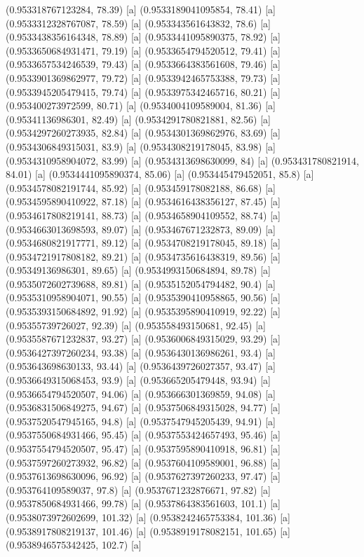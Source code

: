 {{{(0.953318767123284, 78.39) [a] 
(0.9533189041095854, 78.41) [a] 
(0.9533312328767087, 78.59) [a] 
(0.953343561643832, 78.6) [a] 
(0.9533438356164348, 78.89) [a] 
(0.9533441095890375, 78.92) [a] 
(0.9533650684931471, 79.19) [a] 
(0.9533654794520512, 79.41) [a] 
(0.9533657534246539, 79.43) [a] 
(0.9533664383561608, 79.46) [a] 
(0.9533901369862977, 79.72) [a] 
(0.9533942465753388, 79.73) [a] 
(0.9533945205479415, 79.74) [a] 
(0.9533975342465716, 80.21) [a] 
(0.953400273972599, 80.71) [a] 
(0.9534004109589004, 81.36) [a] 
(0.95341136986301, 82.49) [a] 
(0.9534291780821881, 82.56) [a] 
(0.9534297260273935, 82.84) [a] 
(0.9534301369862976, 83.69) [a] 
(0.9534306849315031, 83.9) [a] 
(0.9534308219178045, 83.98) [a] 
(0.9534310958904072, 83.99) [a] 
(0.9534313698630099, 84) [a] 
(0.953431780821914, 84.01) [a] 
(0.9534441095890374, 85.06) [a] 
(0.953445479452051, 85.8) [a] 
(0.9534578082191744, 85.92) [a] 
(0.953459178082188, 86.68) [a] 
(0.9534595890410922, 87.18) [a] 
(0.9534616438356127, 87.45) [a] 
(0.9534617808219141, 88.73) [a] 
(0.9534658904109552, 88.74) [a] 
(0.9534663013698593, 89.07) [a] 
(0.953467671232873, 89.09) [a] 
(0.9534680821917771, 89.12) [a] 
(0.9534708219178045, 89.18) [a] 
(0.9534721917808182, 89.21) [a] 
(0.9534735616438319, 89.56) [a] 
(0.95349136986301, 89.65) [a] 
(0.9534993150684894, 89.78) [a] 
(0.9535072602739688, 89.81) [a] 
(0.9535152054794482, 90.4) [a] 
(0.9535310958904071, 90.55) [a] 
(0.9535390410958865, 90.56) [a] 
(0.9535393150684892, 91.92) [a] 
(0.9535395890410919, 92.22) [a] 
(0.95355739726027, 92.39) [a] 
(0.953558493150681, 92.45) [a] 
(0.9535587671232837, 93.27) [a] 
(0.9536006849315029, 93.29) [a] 
(0.9536427397260234, 93.38) [a] 
(0.9536430136986261, 93.4) [a] 
(0.953643698630133, 93.44) [a] 
(0.9536439726027357, 93.47) [a] 
(0.9536649315068453, 93.9) [a] 
(0.953665205479448, 93.94) [a] 
(0.9536654794520507, 94.06) [a] 
(0.953666301369859, 94.08) [a] 
(0.9536831506849275, 94.67) [a] 
(0.9537506849315028, 94.77) [a] 
(0.9537520547945165, 94.8) [a] 
(0.9537547945205439, 94.91) [a] 
(0.9537550684931466, 95.45) [a] 
(0.9537553424657493, 95.46) [a] 
(0.9537554794520507, 95.47) [a] 
(0.9537595890410918, 96.81) [a] 
(0.9537597260273932, 96.82) [a] 
(0.9537604109589001, 96.88) [a] 
(0.9537613698630096, 96.92) [a] 
(0.9537627397260233, 97.47) [a] 
(0.953764109589037, 97.8) [a] 
(0.9537671232876671, 97.82) [a] 
(0.9537850684931466, 99.78) [a] 
(0.9537864383561603, 101.1) [a] 
(0.9538073972602699, 101.32) [a] 
(0.9538242465753384, 101.36) [a] 
(0.9538917808219137, 101.46) [a] 
(0.9538919178082151, 101.65) [a] 
(0.9538946575342425, 102.7) [a] 
}}}
